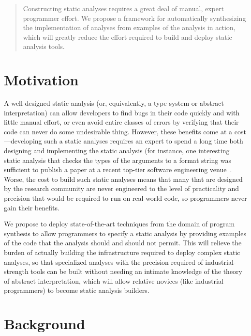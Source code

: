 \documentclass[10pt,conference]{IEEEtran}
\begin{document}
\maketitle

\begin{abstract}

Constructing static analyses requires a great deal of
manual, expert programmer effort. We propose a framework
for automatically synthesizing the implementation of analyses
from examples of the analysis in action, which will greatly
reduce the effort required to build and deploy static analysis
tools.

\end{abstract}

\section{Motivation}

A well-designed static analysis (or, equivalently, a type system or abstract interpretation)
can allow developers to find bugs in their code quickly and with little manual effort,
or even avoid entire classes of errors by verifying that their code can never
do some undesirable thing. However, these benefits come at a
cost---developing such a static analyses 
requires an expert to spend a long time
both designing and implementing the static analysis (for instance, one
interesting static analysis that checks the types of the arguments to a format string was sufficient
to publish a paper at a recent top-tier software engineering venue~\cite{format-string-checker}.
Worse, the cost to build such static analyses means that many that are
designed by the research community are never engineered to the level of practicality and precision
that would be required to run on real-world code, so programmers
never gain their benefits.

We propose to deploy state-of-the-art techniques from the domain of program
synthesis to allow programmers to specify a static analysis by providing
examples of the code that the analysis should and should not permit.
This will relieve the burden of actually building the infrastructure
required to deploy complex static analyses, so that specialized analyses
with the precision required of industrial-strength tools can be built without
needing an intimate knowledge of the theory of abstract interpretation,
which will allow relative novices (like industrial programmers) to become
static analysis builders.

\section{Background}
\end{document}
